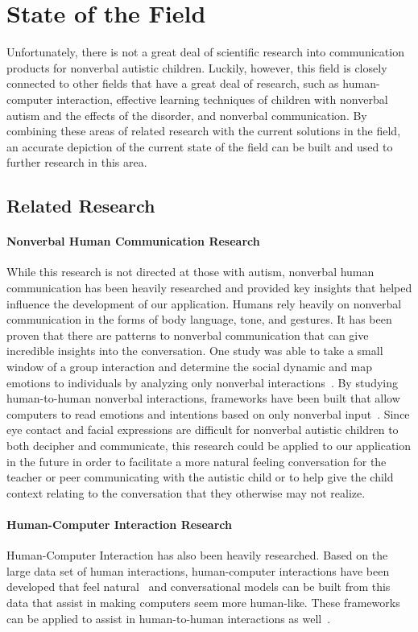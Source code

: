 \chapter{State of the Field}
Unfortunately, there is not a great deal of scientific research into communication products for nonverbal autistic children. Luckily, however, this field is closely connected to other fields that have a great deal of research, such as human-computer interaction, effective learning techniques of children with nonverbal autism and the effects of the disorder, and nonverbal communication.  By combining these areas of related research with the current solutions in the field, an accurate depiction of the current state of the field can be built and used to further research in this area.
\section{Related Research}
\subsubsection{Nonverbal Human Communication Research}
While this research is not directed at those with autism, nonverbal human communication has been heavily researched and provided key insights that helped influence the development of our application. Humans rely heavily on nonverbal communication in the forms of body language, tone, and gestures. It has been proven that there are patterns to nonverbal communication that can give incredible insights into the conversation. One study was able to take a small window of a group interaction and determine the social dynamic and map emotions to individuals by analyzing only nonverbal interactions~\cite{jayagopi}. By studying human-to-human nonverbal interactions, frameworks have been built that allow computers to read emotions and intentions based on only nonverbal input~\cite{sumi}. Since eye contact and facial expressions are difficult for nonverbal autistic children to both decipher and communicate, this research could be applied to our application in the future in order to facilitate a more natural feeling conversation for the teacher or peer communicating with the autistic child or to help give the child context relating to the conversation that they otherwise may not realize.

\subsubsection{Human-Computer Interaction Research}
Human-Computer Interaction has also been heavily researched. Based on the large data set of human interactions, human-computer interactions have been developed that feel natural~\cite{rich} and conversational models can be built from this data that assist in making computers seem more human-like. These frameworks can be applied to assist in human-to-human interactions as well~\cite{sumi}.
